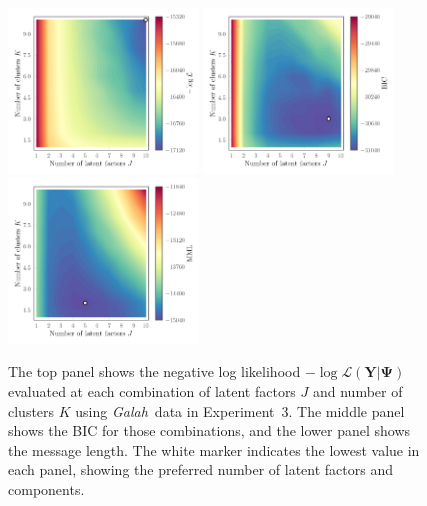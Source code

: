 \documentclass[twocolumn]{aastex62}
\newcommand{\project}[1]{\textsl{#1}}
\newcommand{\Galah}{\project{Galah}}
\newcommand{\vect}[1]{\boldsymbol{\mathbf{#1}}}
\renewcommand{\vec}[1]{\vect{#1}}
\newcommand{\data}{\textbf{Y}}
\newcommand{\NumLatentFactors}{J}
\newcommand{\NumComponents}{K}
\begin{document}
\begin{figure}
	\includegraphics[width=0.45\textwidth]{experiments/exp9-log-xfe-offset-gridsearch-ll.pdf}
	\includegraphics[width=0.45\textwidth]{experiments/exp9-log-xfe-offset-gridsearch-bic.pdf}
	\includegraphics[width=0.45\textwidth]{experiments/exp9-log-xfe-offset-gridsearch-mml.pdf}
    \caption{The top panel shows the negative log likelihood 
			 $-\log{\mathcal{L}\left(\data|\vec\Psi\right)}$ 
			 evaluated at each combination of latent factors 
			 $\NumLatentFactors$ and number of clusters 
			 $\NumComponents$ using \Galah\ data in
			 Experiment~3.  The middle panel shows 
			 the BIC for those combinations, and the lower panel shows the 
			 message length. The white marker indicates the
			 lowest value in each panel, showing the
			 preferred number of latent factors and components.}
    \label{fig:experiment-9-gridsearch}
\end{figure}
\end{document}
